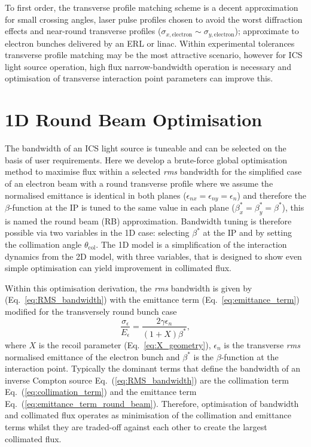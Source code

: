 \documentclass[../main.tex]{subfiles}
\begin{document}
To first order, the transverse profile matching scheme is a decent approximation for small crossing angles, laser pulse profiles chosen to avoid the worst diffraction effects and near-round transverse profiles ($\sigma_{x,\mathrm{electron}}\sim\sigma_{y,\mathrm{electron}}$); approximate to electron bunches delivered by an ERL or linac. Within experimental tolerances transverse profile matching may be the most attractive scenario, however for ICS light source operation, high flux narrow-bandwidth operation is necessary and optimisation of transverse interaction point parameters can improve this. 

\section{1D Round Beam Optimisation}
\label{sec:RB_optimisation}

The bandwidth of an ICS light source is tuneable and can be selected on the basis of user requirements. Here we develop a brute-force global optimisation method to maximise flux within a selected \textit{rms} bandwidth for the simplified case of an electron beam with a round transverse profile where we assume the normalised emittance is identical in both planes ($\epsilon_{nx} = \epsilon_{ny} = \epsilon_{n}$) and therefore the $\beta$-function at the IP is tuned to the same value in each plane ($\beta_{x}^{*} = \beta_{y}^{*} = \beta^{*}$), this is named the round beam (RB) approximation. Bandwidth tuning is therefore possible via two variables in the 1D case: selecting $\beta^{*}$ at the IP and by setting the collimation angle $\theta_{\mathrm{col}}$. The 1D model is a simplification of the interaction dynamics from the 2D model, with three variables, that is designed to show even simple optimisation can yield improvement in collimated flux.

Within this optimisation derivation, the \textit{rms} bandwidth is given by (Eq.~\ref{eq:RMS_bandwidth}) with the emittance term (Eq.~\ref{eq:emittance_term}) modified for the transversely round bunch case
\begin{equation}
\frac{\sigma_{\epsilon}}{E_{\epsilon}} = \frac{2\gamma\epsilon_{n}}{\left(1+X\right)\beta^{*}},
\label{eq:emittance_term_round_beam}    
\end{equation}
where $X$ is the recoil parameter (Eq.~\ref{eq:X_geometry}), $\epsilon_{n}$ is the transverse \textit{rms} normalised emittance of the electron bunch and $\beta^{*}$ is the $\beta$-function at the interaction point. Typically the dominant terms that define the bandwidth of an inverse Compton source Eq.~(\ref{eq:RMS_bandwidth}) are the collimation term Eq.~(\ref{eq:collimation_term}) and the emittance term Eq.~(\ref{eq:emittance_term_round_beam}). Therefore, optimisation of bandwidth and collimated flux operates as minimisation of the collimation and emittance terms whilst they are traded-off against each other to create the largest collimated flux.
\end{document}
